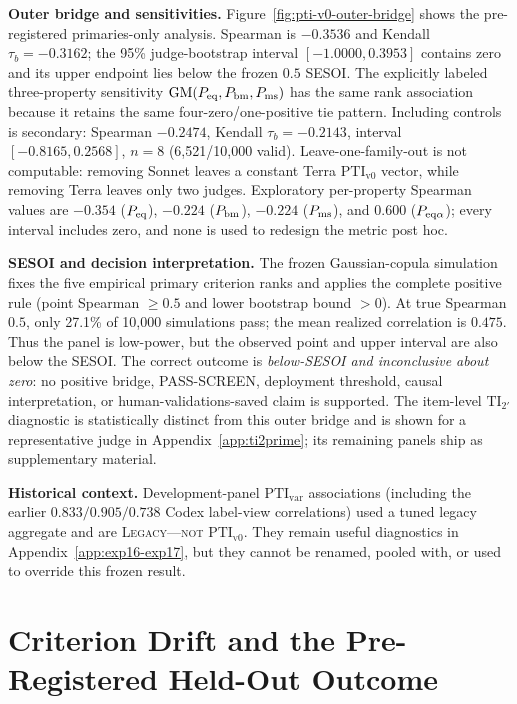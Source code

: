 \documentclass{article}
\newcommand{\TI}{\mathrm{TI}}                    %
\newcommand{\PTI}{\mathrm{PTI}}                  %
\newcommand{\PTIvzero}{\PTI_{\mathrm{v0}}}        %
\newcommand{\PTIvar}{\PTI_{\mathrm{var}}}        %
\newcommand{\GM}{\mathrm{GM}}
\begin{document}
\textbf{Outer bridge and sensitivities.}
Figure~\ref{fig:pti-v0-outer-bridge} shows the pre-registered primaries-only analysis. Spearman is $-0.3536$ and Kendall $\tau_b=-0.3162$; the 95\% judge-bootstrap interval $[-1.0000,0.3953]$ contains zero and its upper endpoint lies below the frozen $0.5$ SESOI. The explicitly labeled three-property sensitivity $\GM(P_{\rm eq},P_{\rm bm},P_{\rm ms})$ has the same rank association because it retains the same four-zero/one-positive tie pattern. Including controls is secondary: Spearman $-0.2474$, Kendall $\tau_b=-0.2143$, interval $[-0.8165,0.2568]$, $n=8$ (6,521/10,000 valid). Leave-one-family-out is not computable: removing Sonnet leaves a constant Terra $\PTIvzero$ vector, while removing Terra leaves only two judges. Exploratory per-property Spearman values are $-0.354$ ($P_{\rm eq}$), $-0.224$ ($P_{\rm bm}$), $-0.224$ ($P_{\rm ms}$), and $0.600$ ($P_{\rm eq\alpha}$); every interval includes zero, and none is used to redesign the metric post hoc.

\textbf{SESOI and decision interpretation.}
The frozen Gaussian-copula simulation fixes the five empirical primary criterion ranks and applies the complete positive rule (point Spearman $\ge0.5$ and lower bootstrap bound $>0$). At true Spearman $0.5$, only 27.1\% of 10,000 simulations pass; the mean realized correlation is $0.475$. Thus the panel is low-power, but the observed point and upper interval are also below the SESOI. The correct outcome is \emph{below-SESOI and inconclusive about zero}: no positive bridge, PASS-SCREEN, deployment threshold, causal interpretation, or human-validations-saved claim is supported. The item-level $\TI_{2'}$ diagnostic is statistically distinct from this outer bridge and is shown for a representative judge in Appendix~\ref{app:ti2prime}; its remaining panels ship as supplementary material.

\textbf{Historical context.}
Development-panel $\PTIvar$ associations (including the earlier $0.833/0.905/0.738$ Codex label-view correlations) used a tuned legacy aggregate and are \textsc{Legacy---not $\PTIvzero$}. They remain useful diagnostics in Appendix~\ref{app:exp16-exp17}, but they cannot be renamed, pooled with, or used to override this frozen result.

\section{Criterion Drift and the Pre-Registered Held-Out Outcome}\label{sec:drift}
\end{document}
